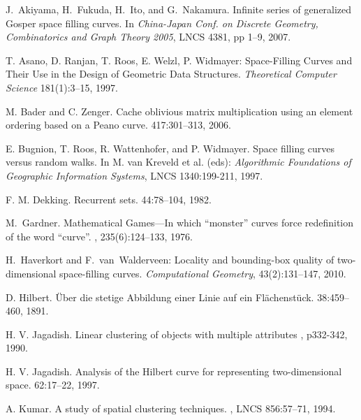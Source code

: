 \documentclass[11pt,a4paper]{article}
\begin{document}
\begin{thebibliography}{10}

J.~Akiyama, H.~Fukuda, H.~Ito, and G.~Nakamura.
\newblock Infinite series of generalized Gosper space filling curves.
\newblock In {\em China-Japan Conf. on Discrete Geometry, Combinatorics and Graph Theory 2005}, LNCS 4381, pp 1--9, 2007.

T. Asano, D. Ranjan, T. Roos, E. Welzl, P. Widmayer:
Space-Filling Curves and Their Use in the Design of Geometric Data Structures.
{\em Theoretical Computer Science} 181(1):3--15, 1997.

M. Bader and C. Zenger.
\newblock Cache oblivious matrix multiplication using an element ordering based on a Peano curve.
 417:301--313, 2006.

E. Bugnion, T. Roos, R. Wattenhofer, and P. Widmayer.
\newblock Space filling curves versus random walks.
\newblock In M. van Kreveld et al. (eds): {\em Algorithmic Foundations of Geographic Information Systems}, LNCS 1340:199-211, 1997.

F. M. Dekking.
\newblock Recurrent sets.
 44:78--104, 1982.

M.~Gardner.
\newblock Mathematical Games---In which ``monster'' curves force redefinition of the word ``curve''.
, 235(6):124--133, 1976.

H.~Haverkort and F.~van~Walderveen:
Locality and bounding-box quality of two-dimensional space-filling curves.
{\em Computational Geometry}, 43(2):131--147, 2010.

D. Hilbert.
\newblock \"Uber die stetige Abbildung einer Linie auf ein Fl\"achenst\"uck.
 38:459--460, 1891.

H. V. Jagadish.
\newblock Linear clustering of objects with multiple attributes
, p332-342, 1990.

H. V. Jagadish.
\newblock Analysis of the Hilbert curve for representing two-dimensional space.
 62:17--22, 1997.

A. Kumar.
\newblock A study of spatial clustering techniques.
, LNCS 856:57--71, 1994.


\end{thebibliography}
\end{document}
